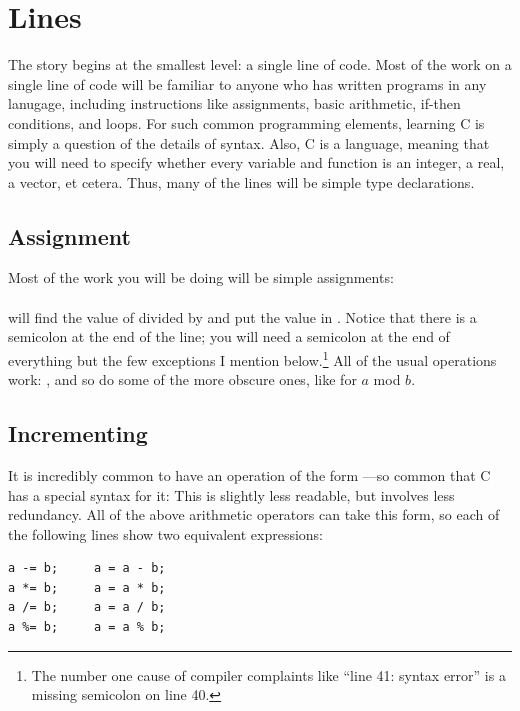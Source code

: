 \documentclass[12pt]{article}
\def\ind#1{\index{#1}#1}
\begin{document}
\section{Lines} \label{fncontents}

The story begins at the smallest level: a single line of code. Most of
the work on a single line of code will be familiar to anyone who has
written programs in any lanugage, including instructions like assignments,
basic arithmetic, if-then conditions, and loops. For such common
programming elements, learning C is simply a question of the details
of syntax. Also, C is a  language, meaning that you will
need to specify whether every variable and function is an integer,
a real, a vector, et cetera. Thus, many of the lines will be simple
type declarations.

\subsection{Assignment}   \index{=}
Most of the work you will be doing will be simple assignments:\\
\\
will find the value of  divided by  and put the
value in . Notice that there is a semicolon at the end of
the line; you will need a semicolon at the end of everything but the few
exceptions I mention below.\footnote{The number one cause of compiler
complaints like ``line 41: \ind{syntax error}'' is a missing semicolon on line 40.} All of the usual operations work: \cinline{+
- / *}, and so do some of the more obscure ones, like 
for $a$ mod $b$.  \index{\%}

\subsection{Incrementing} It is incredibly common to have an operation of the form ---so
common that C has a special syntax for it:  This is slightly less readable, but involves less
redundancy. All of the above arithmetic operators can take this form, so each of the following lines show two
equivalent expressions: \\
\begin{lstlisting}
a -= b;     a = a - b;
a *= b;     a = a * b;
a /= b;     a = a / b;
a %= b;     a = a % b;
\end{lstlisting}
\end{document}
